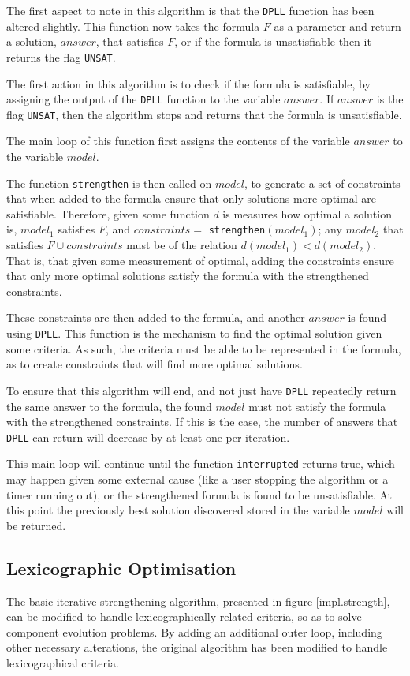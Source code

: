 The first aspect to note in this algorithm is that the \verb+DPLL+ function has been altered slightly.
This function now takes the formula $F$ as a parameter and return a solution, $answer$, that satisfies $F$, 
or if the formula is unsatisfiable then it returns the flag \verb+UNSAT+.

The first action in this algorithm is to check if the formula is satisfiable, by assigning the output of the \verb+DPLL+ function to the variable $answer$.
If $answer$ is the flag \verb+UNSAT+, then the algorithm stops and returns that the formula is unsatisfiable.

The main loop of this function first assigns the contents of the variable $answer$ to the variable $model$.

The function \verb+strengthen+ is then called on $model$, to generate a set of constraints that when added to the formula ensure that only solutions more optimal are satisfiable.
Therefore, given some function $d$ is measures how optimal a solution is, $model_1$ satisfies $F$, and $constraints = $ \verb+strengthen+$(model_1)$;
any $model_2$ that satisfies $F \cup constraints$ must be of the relation $d(model_1) < d(model_2)$.
That is, that given some measurement of optimal, adding the constraints ensure that only more optimal solutions satisfy the formula with the strengthened constraints. 

These constraints are then added to the formula, and another $answer$ is found using \verb+DPLL+.
This function is the mechanism to find the optimal solution given some criteria.
As such, the criteria must be able to be represented in the formula, as to create constraints that will find more optimal solutions.

To ensure that this algorithm will end, and not just have \verb+DPLL+ repeatedly return the same answer to the formula, 
the found $model$ must not satisfy the formula with the strengthened constraints.
If this is the case, the number of answers that \verb+DPLL+ can return will decrease by at least one per iteration.

This main loop will continue until the function \verb+interrupted+ returns true, which may happen given some external cause (like a user stopping the algorithm or a timer running out),
or the strengthened formula is found to be unsatisfiable.
At this point the previously best solution discovered stored in the variable $model$ will be returned.

\subsection{Lexicographic Optimisation}
The basic iterative strengthening algorithm, presented in figure \ref{impl.strength}, can be modified to handle lexicographically related criteria, so as to solve component evolution problems.
By adding an additional outer loop, including other necessary alterations, the original algorithm has been modified to handle lexicographical criteria.


